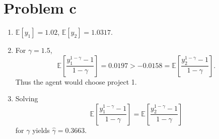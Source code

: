 \section*{Problem c}
\begin{enumerate}
\item
$\mathbb E[y_1]=1.02$, $\mathbb E[y_2]=1.0317$. 
\item
For $\gamma=1.5$,
\begin{equation}
	\mathbb E\left[\frac{y_1^{1-\gamma}-1}{1-\gamma}\right]=0.0197>
	-0.0158=\mathbb E\left[\frac{y_2^{1-\gamma}-1}{1-\gamma}\right].
\end{equation}
Thus the agent would choose project 1.
\item
Solving
\begin{equation}
	\mathbb E\left[\frac{y_1^{1-\gamma}-1}{1-\gamma}\right]=
	\mathbb E\left[\frac{y_2^{1-\gamma}-1}{1-\gamma}\right]
\end{equation}
for $\gamma$ yields $\widehat\gamma=0.3663$.
\end{enumerate}